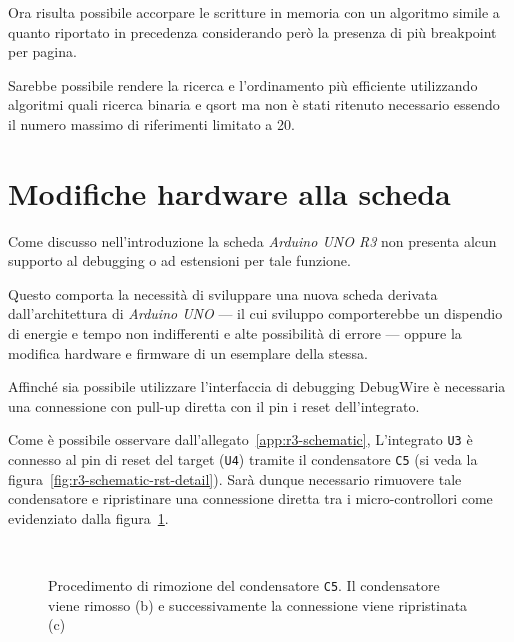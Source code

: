 Ora risulta possibile accorpare le scritture in memoria con un algoritmo simile a quanto riportato in precedenza considerando però la presenza di più breakpoint per pagina.

Sarebbe possibile rendere la ricerca e l'ordinamento più efficiente utilizzando algoritmi quali ricerca binaria e qsort ma non è stati ritenuto necessario essendo il numero massimo di riferimenti limitato a 20.

\section{Modifiche hardware alla scheda}\label{s:dw-board-mod}

Come discusso nell'introduzione la scheda \textit{Arduino UNO R3} non presenta alcun supporto al debugging o ad estensioni per tale funzione.

Questo comporta la necessità di sviluppare una nuova scheda derivata dall'architettura di \textit{Arduino UNO} --- il cui sviluppo comporterebbe un dispendio di energie e tempo non indifferenti e alte possibilità di errore --- oppure la modifica hardware e firmware di un esemplare della stessa.

Affinché sia possibile utilizzare l'interfaccia di debugging DebugWire è necessaria una connessione con pull-up diretta con il pin i reset dell'integrato.

Come è possibile osservare dall'allegato~\ref{app:r3-schematic}, L'integrato \texttt{U3} è connesso al pin di reset del target (\texttt{U4}) tramite il condensatore \texttt{C5} (si veda la figura~\ref{fig:r3-schematic-rst-detail}). Sarà dunque necessario rimuovere tale condensatore e ripristinare una connessione diretta tra i micro-controllori come evidenziato dalla figura~\ref{fig:remove-c5}.

\begin{figure}[t]
    \hfill
    \begin{minipage}{.45\textwidth}
    \end{minipage}
    \begin{minipage}{.45\textwidth}
         \\
    \end{minipage}
    \hfill
    \caption[]{Procedimento di rimozione del condensatore \texttt{C5}. Il condensatore viene rimosso (b) e successivamente la connessione viene ripristinata (c)}\label{fig:remove-c5}
\end{figure}

